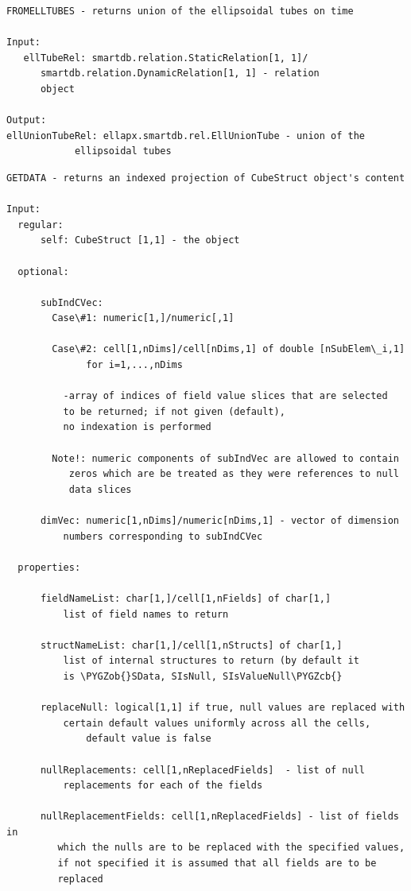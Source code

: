 \documentclass[letterpaper,10pt,english]{sphinxmanual}
\def\PYGZob{\char`\{}
\def\PYGZcb{\char`\}}
\begin{document}
\begin{Verbatim}[commandchars=\\\{\}]
FROMELLTUBES - returns union of the ellipsoidal tubes on time

Input:
   ellTubeRel: smartdb.relation.StaticRelation[1, 1]/
      smartdb.relation.DynamicRelation[1, 1] - relation
      object

Output:
ellUnionTubeRel: ellapx.smartdb.rel.EllUnionTube - union of the
            ellipsoidal tubes
\end{Verbatim}

\begin{Verbatim}[commandchars=\\\{\}]
GETDATA - returns an indexed projection of CubeStruct object's content

Input:
  regular:
      self: CubeStruct [1,1] - the object

  optional:

      subIndCVec:
        Case\#1: numeric[1,]/numeric[,1]

        Case\#2: cell[1,nDims]/cell[nDims,1] of double [nSubElem\_i,1]
              for i=1,...,nDims

          -array of indices of field value slices that are selected
          to be returned; if not given (default),
          no indexation is performed

        Note!: numeric components of subIndVec are allowed to contain
           zeros which are be treated as they were references to null
           data slices

      dimVec: numeric[1,nDims]/numeric[nDims,1] - vector of dimension
          numbers corresponding to subIndCVec

  properties:

      fieldNameList: char[1,]/cell[1,nFields] of char[1,]
          list of field names to return

      structNameList: char[1,]/cell[1,nStructs] of char[1,]
          list of internal structures to return (by default it
          is \PYGZob{}SData, SIsNull, SIsValueNull\PYGZcb{}

      replaceNull: logical[1,1] if true, null values are replaced with
          certain default values uniformly across all the cells,
              default value is false

      nullReplacements: cell[1,nReplacedFields]  - list of null
          replacements for each of the fields

      nullReplacementFields: cell[1,nReplacedFields] - list of fields in
         which the nulls are to be replaced with the specified values,
         if not specified it is assumed that all fields are to be
         replaced


\end{Verbatim}
\end{document}
